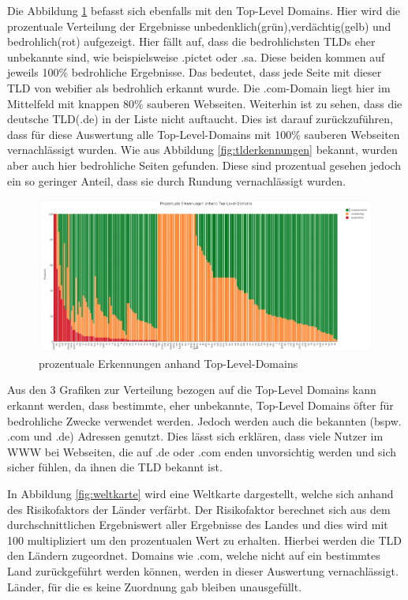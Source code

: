 Die Abbildung \ref{fig:tldprozentual} befasst sich ebenfalls mit den Top-Level Domains. Hier wird die prozentuale Verteilung der Ergebnisse unbedenklich(grün),verdächtig(gelb) und bedrohlich(rot) aufgezeigt. Hier fällt auf, dass die bedrohlichsten \ac{TLD}s eher unbekannte sind, wie beispielsweise .pictet oder .sa. Diese beiden kommen auf jeweils 100\% bedrohliche Ergebnisse. Das bedeutet, dass jede Seite mit dieser \ac{TLD} von webifier als bedrohlich erkannt wurde. Die .com-Domain liegt hier im Mittelfeld mit knappen 80\% sauberen Webseiten. Weiterhin ist zu sehen, dass die deutsche \ac{TLD}(.de) in der Liste nicht auftaucht. Dies ist darauf zurückzuführen, dass für diese Auswertung alle Top-Level-Domains mit 100\% sauberen Webseiten vernachlässigt wurden. Wie aus Abbildung \ref{fig:tlderkennungen} bekannt, wurden aber auch hier bedrohliche Seiten gefunden. Diese sind prozentual gesehen jedoch ein so geringer Anteil, dass sie durch Rundung vernachlässigt wurden.
\begin{figure}[H]
  \centering
  \includegraphics[width=15cm]{images/stats/tldprozentual}
  \caption{prozentuale Erkennungen anhand Top-Level-Domains\protect\footnotemark}
  \label{fig:tldprozentual}
\end{figure}

Aus den 3 Grafiken zur Verteilung bezogen auf die Top-Level Domains kann erkannt werden, dass bestimmte, eher unbekannte, Top-Level Domains öfter für bedrohliche Zwecke verwendet werden. Jedoch werden auch die bekannten (bspw. .com und .de) Adressen genutzt. Dies lässt sich erklären, dass viele Nutzer im \ac{WWW} bei Webseiten, die auf .de oder .com enden unvorsichtig werden und sich sicher fühlen, da ihnen die \ac{TLD} bekannt ist.

In Abbildung \ref{fig:weltkarte} wird eine Weltkarte dargestellt, welche sich anhand des Risikofaktors der Länder verfärbt. Der Risikofaktor berechnet sich aus dem durchschnittlichen Ergebniswert aller Ergebnisse des Landes und dies wird mit 100 multipliziert um den prozentualen Wert zu erhalten. Hierbei werden die \ac{TLD} den Ländern zugeordnet. Domains wie .com, welche nicht auf ein bestimmtes Land zurückgeführt werden können, werden in dieser Auswertung vernachlässigt. Länder, für die es keine Zuordnung gab bleiben unausgefüllt.

